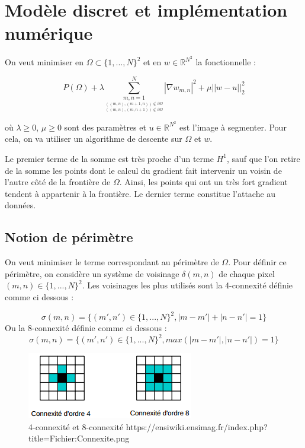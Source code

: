 \section{Modèle discret et implémentation numérique}

On veut minimiser en $\Omega \subset \{1,...,N\}^2$ et en $w \in \mathbb{R}^{N^2}$ la fonctionnelle : 

\[ P(\Omega) + \lambda \sum \limits_{\underset{((m,n), (m, n+1)) \notin \partial \Omega}{\underset{((m,n),(m+1, n)) \notin \partial \Omega}{m,n = 1}}}^{N} |\nabla w_{m,n}|^2 + \mu ||w - u ||_2^2 \]

où $\lambda \geq 0$, $\mu \geq 0$ sont des paramètres et $u \in \mathbb{R}^{N^2}$ est l'image à segmenter. Pour cela, on va utiliser un algorithme de descente sur $\Omega$ et $w$.

\bigskip

Le premier terme de la somme est très proche d'un terme $H^1$, sauf que l'on retire de la somme les points dont le calcul du gradient fait intervenir un voisin de l'autre côté de la frontière de $\Omega$. Ainsi, les points qui ont un très fort gradient tendent à appartenir à la frontière. Le dernier terme constitue l'attache au données. 

\subsection{Notion de périmètre}

On veut minimiser le terme correspondant au périmètre de $\Omega$. Pour définir ce périmètre, on considère un système de voisinage $\delta(m,n)$ de chaque pixel $(m,n) \in \{1,...,N\}^2$. Les voisinages les plus utilisés sont la 4-connexité définie comme ci dessous :

\[ \sigma (m,n) = \{ (m',n') \in  \{1,...,N\}^2, |m - m' | + |n - n'| = 1 \}\]
Ou la 8-connexité définie comme ci dessous : 
\[ \sigma (m,n) = \{ (m',n') \in  \{1,...,N\}^2, max(|m - m' | , |n - n'| ) = 1 \}\]

\begin{figure}[H]
\centering
\includegraphics[scale=1]{images/Connexite.png}
\caption{4-connexité et 8-connexité \newline  https://ensiwiki.ensimag.fr/index.php?title=Fichier:Connexite.png}
\end{figure}

